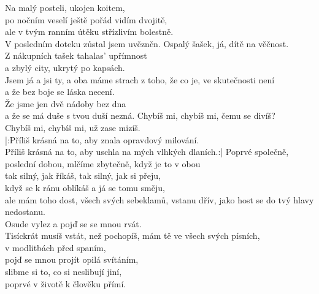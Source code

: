 \ve{}
Na malý posteli, ukojen koitem,\\
po nočním veselí ještě pořád vidím dvojitě,\\
ale v tvým ranním útěku střízlivím bolestně.\\
V posledním doteku zůstal jsem uvězněn.
\ve{}
Ospalý šašek, já, dítě na věčnost.\\
Z nákupních tašek tahalas' upřímnost\\
a zbylý city, ukrytý po kapsách.\\
Jsem já a jsi ty, a oba máme strach
\ve{}
z toho, že co je, ve skutečnosti není\\
a že bez boje se láska necení.\\
Že jsme jen dvě nádoby bez dna\\
a že se má duše s tvou duší nezná.
\cho{}
Chybíš mi, chybíš mi,
čemu se divíš?\\
Chybíš mi, chybíš mi,
už zase mizíš.\\
|:Příliš krásná na to,
aby znala opravdový milování.\\
Příliš krásná na to,
aby uschla na mých vlhkých dlaních.:|
\ve{}
Poprvé společně, poslední dobou,
mlčíme zbytečně, když je to v obou\\
tak silný, jak říkáš,
tak silný, jak si přeju,\\
když se k ránu oblíkáš
a já se tomu směju,\\
\ve{}
ale mám toho dost,
všech svých sebeklamů,
vstanu dřív, jako host se do tvý hlavy nedostanu.\\
Osude vylez a pojď se se mnou rvát.\\
Tisíckrát musíš vstát,
než pochopíš,
\ve{}mám tě ve všech svých písních,\\
v modlitbách před spaním,\\
pojď se mnou projít opilá svítáním,\\
slibme si to, co si neslibují jiní,\\
poprvé v životě k člověku přímí.
\cho{}
\esong{}